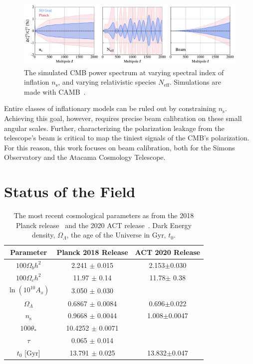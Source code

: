 \begin{figure}[t!]
    \centering
    \includegraphics[width = \textwidth]{Figures/beam_neff.pdf}
    \caption{The simulated CMB power spectrum at varying spectral index of inflation $n_\text{s}$, and varying relativistic species $N_{\text{eff}}$.  Simulations are made with CAMB~\cite{camb_online}.}
    \label{fig:cmb_ns}
\end{figure}

Entire classes of inflationary models can be ruled out by constraining $n_{\text{s}}$.  Achieving this goal, however, requires precise beam calibration on these small angular scales.  Further, characterizing the polarization leakage from the telescope's beam is critical to map the tiniest signals of the CMB's polarization.  For this reason, this work focuses on beam calibration, both for the Simons Observatory and the Atacama Cosmology Telescope.

\section{Status of the Field}
\begin{table}[b]
    \centering
    \begin{tabular}{|c|c|c|}\hline 
         Parameter & Planck 2018 Release & ACT 2020 Release \\ \hline
         $100\Omega_b h^2$ &  2.241 $\pm$ 0.015 &2.153$\pm$0.030 \\
         $100\Omega_c h^2$ & 11.97 $\pm$ 0.14 & 11.78$\pm$ 0.38\\
         $\ln(10^{10}A_s)$ &  3.050 $\pm$ 0.030 & \\
         $\Omega_\Lambda$ & 0.6867 $\pm$ 0.0084 & 0.696$\pm$0.022\\
         $n_{\text{s}}$ & 0.9668 $\pm$ 0.0044 & 1.008$\pm$0.0047\\
         $100\theta_{*}$ & 10.4252 $\pm$ 0.0071& \\ 
         $\tau$   &0.065 $\pm$ 0.014 & \\
         $t_0$ [Gyr] & 13.791 $\pm$ 0.025 & 13.832$\pm$0.047\\
         \hline
    \end{tabular}
    \caption{The most recent cosmological parameters as from the 2018 Planck release~\cite{planck2020} and the 2020 ACT release~\cite{aiola_2020}.  Dark Energy density, $\Omega_\Lambda$, the age of the Universe in Gyr, $t_0$.}
    \label{tab:cosmology_recent_results}
\end{table}

